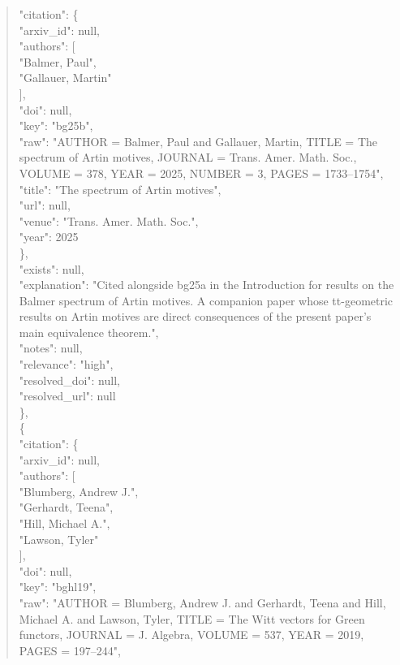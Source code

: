 \documentclass[11pt]{article}
\begin{document}
\begin{quote}
      "citation": \{\\
        "arxiv\_id": null,\\
        "authors": [\\
          "Balmer, Paul",\\
          "Gallauer, Martin"\\
        ],\\
        "doi": null,\\
        "key": "bg25b",\\
        "raw": "AUTHOR = Balmer, Paul and Gallauer, Martin, TITLE = The spectrum of Artin motives, JOURNAL = Trans. Amer. Math. Soc., VOLUME = 378, YEAR = 2025, NUMBER = 3, PAGES = 1733--1754",\\
        "title": "The spectrum of Artin motives",\\
        "url": null,\\
        "venue": "Trans. Amer. Math. Soc.",\\
        "year": 2025\\
      \},\\
      "exists": null,\\
      "explanation": "Cited alongside bg25a in the Introduction for results on the Balmer spectrum of Artin motives. A companion paper whose tt-geometric results on Artin motives are direct consequences of the present paper's main equivalence theorem.",\\
      "notes": null,\\
      "relevance": "high",\\
      "resolved\_doi": null,\\
      "resolved\_url": null\\
    \},\\
    \{\\
      "citation": \{\\
        "arxiv\_id": null,\\
        "authors": [\\
          "Blumberg, Andrew J.",\\
          "Gerhardt, Teena",\\
          "Hill, Michael A.",\\
          "Lawson, Tyler"\\
        ],\\
        "doi": null,\\
        "key": "bghl19",\\
        "raw": "AUTHOR = Blumberg, Andrew J. and Gerhardt, Teena and Hill, Michael A. and Lawson, Tyler, TITLE = The Witt vectors for Green functors, JOURNAL = J. Algebra, VOLUME = 537, YEAR = 2019, PAGES = 197--244",\\

\end{quote}
\end{document}
